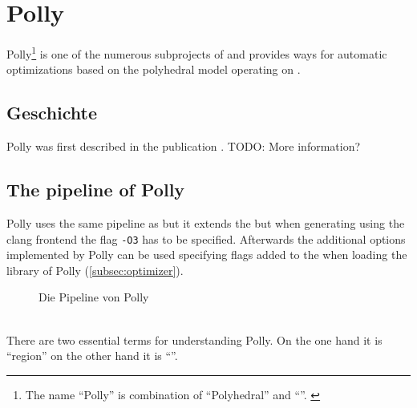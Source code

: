 \chapter{Polly}
Polly\footnote{The name \enquote{Polly} is combination of \enquote{Polyhedral} and \enquote{\llvm}. \cite{PollyGrosser}} is one of the numerous subprojects of \llvm and provides ways for automatic optimizations based on the polyhedral model operating on \llvmir.

\section{Geschichte}
Polly was first described in the publication \cite{PollyGrosser}. TODO: More information?

\section{The pipeline of Polly}
Polly uses the same pipeline as \llvm but it extends the \opt but when generating \llvmir using the clang frontend the flag \texttt{-O3} has to be specified.
Afterwards the additional options implemented by Polly can be used specifying flags added to the \opt when loading the library of Polly (\autoref{subsec:optimizer}).
\begin{figure}[h]
    \caption{Die Pipeline von Polly \cite{PollyPresentation}}
    \centering
\end{figure}\\
There are two essential terms for understanding Polly. On the one hand it is \enquote{region} on the other hand it is \enquote{\scop}.
